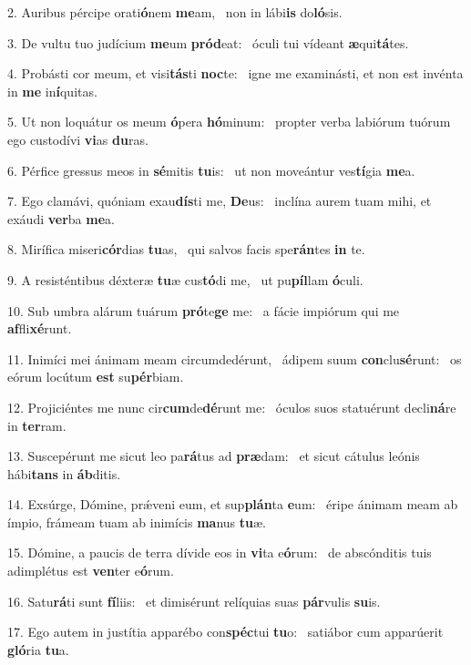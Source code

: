 2. Auribus pércipe orati\textbf{ó}nem \textbf{me}am, \ast\  non in lábi\textbf{is} do\textbf{ló}sis.\

3. De vultu tuo judícium \textbf{me}um \textbf{pród}eat: \ast\  óculi tui vídeant \textbf{æ}qui\textbf{tá}tes.\

4. Probásti cor meum, et visi\textbf{tás}ti \textbf{noc}te: \ast\  igne me examinásti, et non est invénta in \textbf{me} in\textbf{í}quitas.\

5. Ut non loquátur os meum \textbf{ó}pera \textbf{hó}minum: \ast\  propter verba labiórum tuórum ego custodívi \textbf{vi}as \textbf{du}ras.\

6. Pérfice gressus meos in \textbf{sé}mitis \textbf{tu}is: \ast\  ut non moveántur ves\textbf{tí}gia \textbf{me}a.\

7. Ego clamávi, quóniam exau\textbf{dís}ti me, \textbf{De}us: \ast\  inclína aurem tuam mihi, et exáudi \textbf{ver}ba \textbf{me}a.\

8. Mirífica miseri\textbf{cór}dias \textbf{tu}as, \ast\  qui salvos facis spe\textbf{rán}tes \textbf{in} te.\

9. A resisténtibus déxteræ \textbf{tu}æ cus\textbf{tó}di me, \ast\  ut pu\textbf{píl}lam \textbf{ó}culi.\

10. Sub umbra alárum tuárum \textbf{pró}te\textbf{ge} me: \ast\  a fácie impiórum qui me \textbf{af}fli\textbf{xé}runt.\

11. Inimíci mei ánimam meam circumdedérunt, \dag\  ádipem suum \textbf{con}clu\textbf{sé}runt: \ast\  os eórum locútum \textbf{est} su\textbf{pér}biam.\

12. Projiciéntes me nunc cir\textbf{cum}de\textbf{dé}runt me: \ast\  óculos suos statuérunt decli\textbf{ná}re in \textbf{ter}ram.\

13. Suscepérunt me sicut leo pa\textbf{rá}tus ad \textbf{præ}dam: \ast\  et sicut cátulus leónis hábi\textbf{tans} in \textbf{áb}ditis.\

14. Exsúrge, Dómine, prǽveni eum, et sup\textbf{plán}ta \textbf{e}um: \ast\  éripe ánimam meam ab ímpio, frámeam tuam ab inimícis \textbf{ma}nus \textbf{tu}æ.\

15. Dómine, a paucis de terra dívide eos in \textbf{vi}ta e\textbf{ó}rum: \ast\  de abscónditis tuis adimplétus est \textbf{ven}ter e\textbf{ó}rum.\

16. Satu\textbf{rá}ti sunt \textbf{fí}liis: \ast\  et dimisérunt relíquias suas \textbf{pár}vulis \textbf{su}is.\

17. Ego autem in justítia apparébo con\textbf{spéc}tui \textbf{tu}o: \ast\  satiábor cum apparúerit \textbf{gló}ria \textbf{tu}a.\

